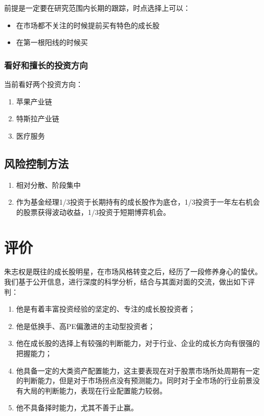 \documentclass[hyperref,]{ctexart}
\providecommand{\tightlist}{%
  \setlength{\itemsep}{0pt}\setlength{\parskip}{0pt}}
\begin{document}
前提是一定要在研究范围内长期的跟踪，时点选择上可以：

\begin{itemize}
\tightlist
\item
  在市场都不关注的时候提前买有特色的成长股
\item
  在第一根阳线的时候买
\end{itemize}

\subsubsection{看好和擅长的投资方向}

当前看好两个投资方向：

\begin{enumerate}
\def\labelenumi{\arabic{enumi}.}
\tightlist
\item
  苹果产业链
\item
  特斯拉产业链
\item
  医疗服务
\end{enumerate}

\subsection{风险控制方法}

\begin{enumerate}
\def\labelenumi{\arabic{enumi}.}
\tightlist
\item
  相对分散、阶段集中
\item
  作为基金经理1/3投资于长期持有的成长股作为底仓，1/3投资于一年左右机会的股票获得波动收益，1/3投资于短期博弈机会。
\end{enumerate}

\section{评价}

朱志权是既往的成长股明星，在市场风格转变之后，经历了一段修养身心的蛰伏。我们基于公开信息，进行深度的科学分析，结合与其面对面的交流，做出如下评判：

\begin{enumerate}
\def\labelenumi{\arabic{enumi}.}
\tightlist
\item
  他是有着丰富投资经验的坚定的、专注的成长股投资者；
\item
  他是低换手、高PE偏激进的主动型投资者；
\item
  他在成长股的选择上有较强的判断能力，对于行业、企业的成长方向有很强的把握能力；
\item
  他具备一定的大类资产配置能力，这主要表现在对于股票市场所处周期有一定的判断能力，但是对于市场拐点没有预测能力。同时对于全市场的行业前景没有大局的判断能力，表现在行业配置能力较弱。
\item
  他不具备择时能力，尤其不善于止赢。
\end{enumerate}
\end{document}
